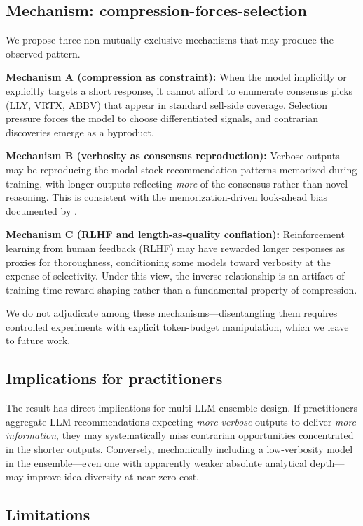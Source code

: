 \documentclass[11pt,letterpaper]{article}
\begin{document}
\subsection{Mechanism: compression-forces-selection}

We propose three non-mutually-exclusive mechanisms that may produce the observed pattern.

\textbf{Mechanism A (compression as constraint):} When the model implicitly or explicitly targets a short response, it cannot afford to enumerate consensus picks (LLY, VRTX, ABBV) that appear in standard sell-side coverage. Selection pressure forces the model to choose differentiated signals, and contrarian discoveries emerge as a byproduct.

\textbf{Mechanism B (verbosity as consensus reproduction):} Verbose outputs may be reproducing the modal stock-recommendation patterns memorized during training, with longer outputs reflecting \textit{more} of the consensus rather than novel reasoning. This is consistent with the memorization-driven look-ahead bias documented by \citet{roy2026}.

\textbf{Mechanism C (RLHF and length-as-quality conflation):} Reinforcement learning from human feedback (RLHF) may have rewarded longer responses as proxies for thoroughness, conditioning some models toward verbosity at the expense of selectivity. Under this view, the inverse relationship is an artifact of training-time reward shaping rather than a fundamental property of compression.

We do not adjudicate among these mechanisms---disentangling them requires controlled experiments with explicit token-budget manipulation, which we leave to future work.

\subsection{Implications for practitioners}

The result has direct implications for multi-LLM ensemble design. If practitioners aggregate LLM recommendations expecting \textit{more verbose} outputs to deliver \textit{more information}, they may systematically miss contrarian opportunities concentrated in the shorter outputs. Conversely, mechanically including a low-verbosity model in the ensemble---even one with apparently weaker absolute analytical depth---may improve idea diversity at near-zero cost.

\subsection{Limitations}
\end{document}
